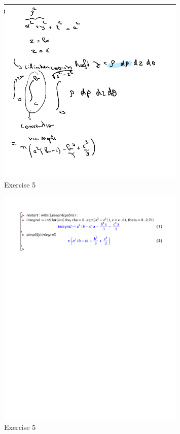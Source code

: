 \documentclass[a4paper]{article}
\begin{document}
\begin{figure}[H]
	\centering
	\includegraphics[width=0.8\textwidth]{assets/huis_5_ex_5.png}
	\caption{Exercise 5}
	\label{fig:huis_5_ex_5}
\end{figure}

\begin{figure}[H]
	\centering
	\includegraphics[width=0.8\textwidth]{exercises/huis_5_ex_5.pdf}
	\caption{Exercise 5}
	\label{fig:huis_5_ex_5_maple}
\end{figure}
\end{document}
